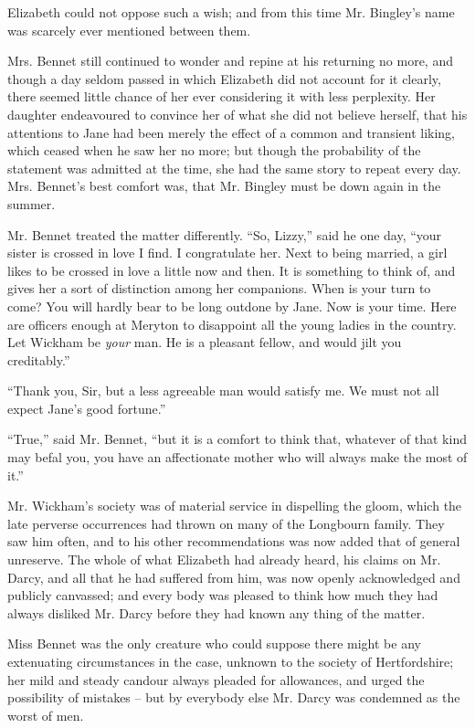 Elizabeth could not oppose such a wish; and from this
time Mr. Bingley’s name was scarcely ever mentioned
between them.

Mrs. Bennet still continued to wonder and repine at
his returning no more, and though a day seldom passed
in which Elizabeth did not account for it clearly, there
seemed little chance of her ever considering it with less
perplexity. Her daughter endeavoured to convince her
of what she did not believe herself, that his attentions
to Jane had been merely the effect of a common and
transient liking, which ceased when he saw her no more;
but though the probability of the statement was admitted
at the time, she had the same story to repeat every day.
Mrs. Bennet’s best comfort was, that Mr. Bingley must
be down again in the summer.

Mr. Bennet treated the matter differently. “So,
Lizzy,” said he one day, “your sister is crossed in love
I find. I congratulate her. Next to being married, a girl
likes to be crossed in love a little now and then. It is
something to think of, and gives her a sort of distinction
among her companions. When is your turn to come?
You will hardly bear to be long outdone by Jane. Now
is your time. Here are officers enough at Meryton to
disappoint all the young ladies in the country. Let
Wickham be \textit{your} man. He is a pleasant fellow, and would
jilt you creditably.”

“Thank you, Sir, but a less agreeable man would satisfy
me. We must not all expect Jane’s good fortune.”

“True,” said Mr. Bennet, “but it is a comfort to think
that, whatever of that kind may befal you, you have an
affectionate mother who will always make the most of it.”

Mr. Wickham’s society was of material service in dispelling
the gloom, which the late perverse occurrences had
thrown on many of the Longbourn family. They saw
him often, and to his other recommendations was now
added that of general unreserve. The whole of what
Elizabeth had already heard, his claims on Mr. Darcy,
and all that he had suffered from him, was now openly
acknowledged and publicly canvassed; and every body
was pleased to think how much they had always disliked
Mr. Darcy before they had known any thing of the matter.

Miss Bennet was the only creature who could suppose
there might be any extenuating circumstances in the case,
unknown to the society of Hertfordshire; her mild and
steady candour always pleaded for allowances, and urged
the possibility of mistakes -- but by everybody else
Mr. Darcy was condemned as the worst of men.

